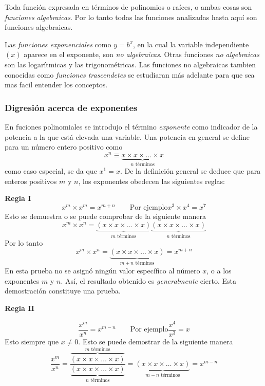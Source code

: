 Toda función expresada en términos de polinomios o raíces, o ambas cosas son \textit{funciones algebraicas}. Por lo tanto todas las funciones analizadas hasta aquí son funciones algebraicas.

Las \textit{funciones exponenciales} como \(y=b^x\), en la cual la variable independiente \((x)\) aparece en el exponente, son \textit{no algebraicas}. Otras funciones \textit{no algebraicas} son las logarítmicas y las trigonométricas. Las funciones no algebraicas tambien conocidas como \textit{funciones trascendetes} se estudiaran más adelante para que sea mas facil entender los conceptos.


\subsubsection{Digresión acerca de exponentes}

En fuciones polinomiales se introdujo el término \textit{exponente} como indicador de la potencia a la que está elevada una variable. Una potencia en general se define para un número entero positivo como
\[
x^n \equiv \underbrace{x \times x \times \dots \times x}_{n \text{ términos}}
\]
como caso especial, se da que \(x^1 = x\). De la definición general se deduce que para enteros positivos \(m\) y \(n\), los exponentes obedecen las siguientes reglas:

\textbf{Regla I}
\[
x^m \times x^m = x^{m+n} \qquad \text{Por ejemplo} x^3 \times x^4 = x^7
\]
Esto se demuestra o se puede comprobar de la siguiente manera
\[
x^m \times x^n = \underbrace{(x \times x \times \dots \times x)}_{m \text{ términos}} \underbrace{(x \times x \times \dots \times x)}_{n \text{ términos}}
\]
Por lo tanto 
\[
x^m \times x^n = \underbrace{(x \times x \times \dots \times x)}_{m+n \text{ términos}} = x^{m+n}
\]
En esta prueba no se asignó ningún valor específico al número \(x\), o a los exponentes \(m\) y \(n\). Así, el resultado obtenido es \textit{generalmente} cierto. Esta demostración constituye una prueba.

\textbf{Regla II}

\[
\frac{x^m}{x^n} = x^{m-n} \qquad \text{Por ejemplo} \frac{x^4}{x^3}=x
\]
Esto siempre que \(x \neq 0\). Esto se puede demostrar de la siguiente manera 
\[
\frac{x^m}{x^n} = \frac{\overbrace{(x \times x \times \dots \times x)}^{m \text{ términos}}}{\underbrace{(x \times x \times \dots \times x)}_{n \text{ términos}}} = \underbrace{(x \times x \times \dots \times x)}_{m-n \text{ términos}} = x^{m-n}
\]

